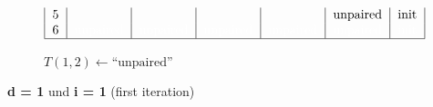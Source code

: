 \begin{figure}[H]
\begin{subfigure}[t]{0.65\textwidth}
\[\begin{tabular}{|c|c|c|c|c|c|c|}
                                    5     &                           &          &          &          & unpaired & init  \\
                                    6 & \textcolor{white}{unpaired} & \textcolor{white}{unpaired} & \textcolor{white}{unpaired}
                                    & \textcolor{white}{unpaired}
                                    & \textcolor{white}{unpaired}
                                    & \textcolor{white}{init}
                                    \\ \hline
                        \end{tabular}
        \]
        \caption{$T(1,2) \gets \text{``unpaired''}$ }
    \end{subfigure}
    \caption{\textbf{d = 1} und \textbf{i = 1} (first iteration)}\label{fig:figure19}

\end{figure}



